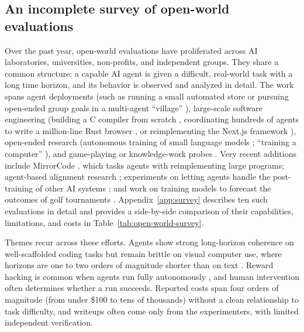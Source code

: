 \documentclass{article}
\begin{document}
\subsection{An incomplete survey of open-world evaluations}\label{an-incomplete-survey-of-open-world-evaluations}

Over the past year, open-world evaluations have proliferated across AI laboratories, universities, non-profits, and independent groups. They share a common structure: a capable AI agent is given a difficult, real-world task with a long time horizon, and its behavior is observed and analyzed in detail. The work spans agent deployments (such as running a small automated store \citep{anthropicComResearchProject2} or pursuing open-ended group goals in a multi-agent ``village'' \citep{theaidigestOrgVillage}), large-scale software engineering (building a C compiler from scratch \citep{anthropicComEngineeringBuilding}, coordinating hundreds of agents to write a million-line Rust browser \citep{cursorComBlogScaling}, or reimplementing the Next.js framework \citep{blogCloudflareComVinext}), open-ended research (autonomous training of small language models \citep{xkarpathy2031135152349524125}; ``training a computer'' \citep{xDimitrisPapail2028669695344148946}), and game-playing or knowledge-work probes \citep{futurismComAdvancedAi,epochAiGradientUpdates}. Very recent additions include MirrorCode \citep{epochAiBlogMirrorcode}, which tasks agents with reimplementing large programs; agent-based alignment research \citep{alignmentAnthropicCom2026}; experiments on letting agents handle the post-training of other AI systems \citep{thoughtfullabComLetting}; and work on training models to forecast the outcomes of golf tournaments \citep{githubComRecipesGolf}. Appendix~\ref{app:survey} describes ten such evaluations in detail and provides a side-by-side comparison of their capabilities, limitations, and costs in Table~\ref{tab:open-world-survey}.

Themes recur across these efforts. Agents show strong long-horizon coherence on well-scaffolded coding tasks but remain brittle on visual computer use, where horizons are one to two orders of magnitude shorter than on text \citep{epochAiGradientUpdates}. Reward hacking is common when agents run fully autonomously \citep{xDimitrisPapail2028669695344148946}, and human intervention often determines whether a run succeeds. Reported costs span four orders of magnitude (from under \$100 to tens of thousands) without a clean relationship to task difficulty, and writeups often come only from the experimenters, with limited independent verification.
\end{document}
